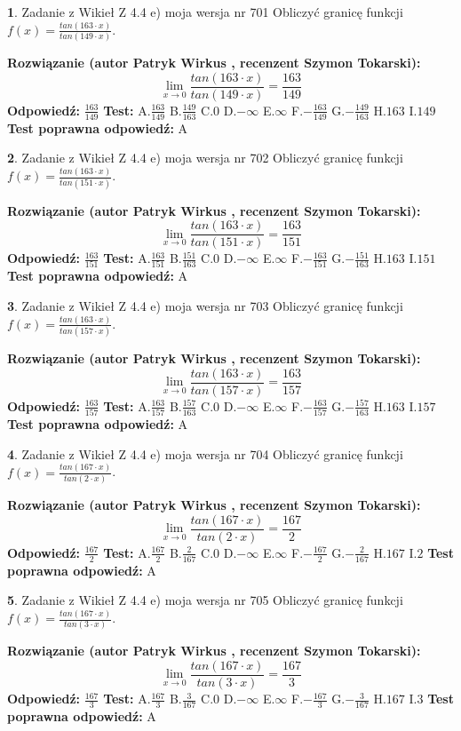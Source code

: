 \documentclass[12pt, a4paper]{article}
\theoremstyle{definition} %
\newtheorem{zad}{}
\newcommand{\zadStart}[1]{\begin{zad}#1\newline}
\newcommand{\zadStop}{\end{zad}}
\newcommand{\rozwStart}[2]{\noindent \textbf{Rozwiązanie (autor #1 , recenzent #2): }\newline}
\newcommand{\rozwStop}{\newline}
\newcommand{\odpStart}{\noindent \textbf{Odpowiedź:}\newline}
\newcommand{\odpStop}{\newline}
\newcommand{\testStart}{\noindent \textbf{Test:}\newline}
\newcommand{\testStop}{\newline}
\newcommand{\kluczStart}{\noindent \textbf{Test poprawna odpowiedź:}\newline}
\newcommand{\kluczStop}{\newline}
\begin{document}
\zadStart{Zadanie z Wikieł Z 4.4 e) moja wersja nr 701}
Obliczyć granicę funkcji $f(x)=\frac{tan(163\cdot x)}{tan(149\cdot x)}$.
\zadStop
\rozwStart{Patryk Wirkus}{Szymon Tokarski}
$$\lim\limits_{x\to 0}\frac{tan(163\cdot x)}{tan(149\cdot x)}=
\frac{163}{149}$$
\rozwStop
\odpStart
$\frac{163}{149}$
\odpStop
\testStart
A.$\frac{163}{149}$
B.$\frac{149}{163}$
C.$0$
D.$-\infty$
E.$\infty$
F.$-\frac{163}{149}$
G.$-\frac{149}{163}$
H.$163$
I.$149$
\testStop
\kluczStart
A
\kluczStop



\zadStart{Zadanie z Wikieł Z 4.4 e) moja wersja nr 702}
Obliczyć granicę funkcji $f(x)=\frac{tan(163\cdot x)}{tan(151\cdot x)}$.
\zadStop
\rozwStart{Patryk Wirkus}{Szymon Tokarski}
$$\lim\limits_{x\to 0}\frac{tan(163\cdot x)}{tan(151\cdot x)}=
\frac{163}{151}$$
\rozwStop
\odpStart
$\frac{163}{151}$
\odpStop
\testStart
A.$\frac{163}{151}$
B.$\frac{151}{163}$
C.$0$
D.$-\infty$
E.$\infty$
F.$-\frac{163}{151}$
G.$-\frac{151}{163}$
H.$163$
I.$151$
\testStop
\kluczStart
A
\kluczStop



\zadStart{Zadanie z Wikieł Z 4.4 e) moja wersja nr 703}
Obliczyć granicę funkcji $f(x)=\frac{tan(163\cdot x)}{tan(157\cdot x)}$.
\zadStop
\rozwStart{Patryk Wirkus}{Szymon Tokarski}
$$\lim\limits_{x\to 0}\frac{tan(163\cdot x)}{tan(157\cdot x)}=
\frac{163}{157}$$
\rozwStop
\odpStart
$\frac{163}{157}$
\odpStop
\testStart
A.$\frac{163}{157}$
B.$\frac{157}{163}$
C.$0$
D.$-\infty$
E.$\infty$
F.$-\frac{163}{157}$
G.$-\frac{157}{163}$
H.$163$
I.$157$
\testStop
\kluczStart
A
\kluczStop



\zadStart{Zadanie z Wikieł Z 4.4 e) moja wersja nr 704}
Obliczyć granicę funkcji $f(x)=\frac{tan(167\cdot x)}{tan(2\cdot x)}$.
\zadStop
\rozwStart{Patryk Wirkus}{Szymon Tokarski}
$$\lim\limits_{x\to 0}\frac{tan(167\cdot x)}{tan(2\cdot x)}=
\frac{167}{2}$$
\rozwStop
\odpStart
$\frac{167}{2}$
\odpStop
\testStart
A.$\frac{167}{2}$
B.$\frac{2}{167}$
C.$0$
D.$-\infty$
E.$\infty$
F.$-\frac{167}{2}$
G.$-\frac{2}{167}$
H.$167$
I.$2$
\testStop
\kluczStart
A
\kluczStop



\zadStart{Zadanie z Wikieł Z 4.4 e) moja wersja nr 705}
Obliczyć granicę funkcji $f(x)=\frac{tan(167\cdot x)}{tan(3\cdot x)}$.
\zadStop
\rozwStart{Patryk Wirkus}{Szymon Tokarski}
$$\lim\limits_{x\to 0}\frac{tan(167\cdot x)}{tan(3\cdot x)}=
\frac{167}{3}$$
\rozwStop
\odpStart
$\frac{167}{3}$
\odpStop
\testStart
A.$\frac{167}{3}$
B.$\frac{3}{167}$
C.$0$
D.$-\infty$
E.$\infty$
F.$-\frac{167}{3}$
G.$-\frac{3}{167}$
H.$167$
I.$3$
\testStop
\kluczStart
A
\kluczStop
\end{document}
